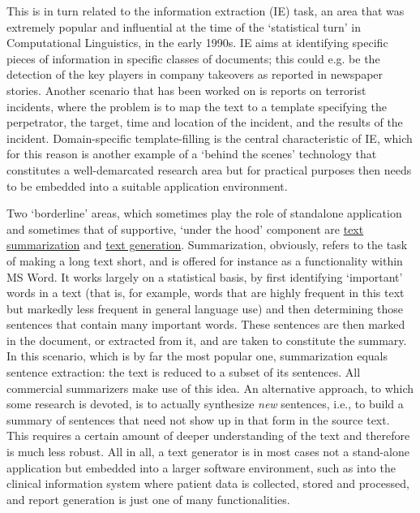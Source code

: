 \begin{multicols}{2}
\begin{itemize}
\begin{multicols}{2}

This is in turn related to the information extraction (IE) task, an area that was extremely popular and influential at the time of the ‘statistical turn’ in Computational Linguistics, in the early 1990s. IE aims at identifying specific pieces of information in specific classes of documents; this could e.g. be the detection of the key players in company takeovers as reported in newspaper stories. Another scenario that has been worked on is reports on terrorist incidents, where the problem is to map the text to a template specifying the perpetrator, the target, time and location of the incident, and the results of the incident. Domain-specific template-filling is the central characteristic of IE, which for this reason is another example of a ‘behind the scenes’ technology that constitutes a well-demarcated research area but for practical purposes then needs to be embedded into a suitable application environment. 

Two ‘borderline’ areas, which sometimes play the role of standalone application and sometimes that of supportive, ‘under the hood’ component are \uline{text summarization} and \uline{text generation}. Summarization, obviously, refers to the task of making a long text short, and is offered for instance as a functionality within MS Word. It works largely on a statistical basis, by first identifying ‘important’ words in a text (that is, for example, words that are highly frequent in this text but markedly less frequent in general language use) and then determining those sentences that contain many important words. These sentences are then marked in the document, or extracted from it, and are taken to constitute the summary. In this scenario, which is by far the most popular one, summarization equals sentence extraction: the text is reduced to a subset of its sentences. All commercial summarizers make use of this idea. An alternative approach, to which some research is devoted, is to actually synthesize \textit{new} sentences, i.e., to build a summary of sentences that need not show up in that form in the source text. This requires a certain amount of deeper understanding of the text and therefore is much less robust. All in all, a text generator is in most cases not a stand-alone application but embedded into a larger software environment, such as into the clinical information system where patient data is collected, stored and processed, and report generation is just one of many functionalities.


\end{multicols}
\end{itemize}
\end{multicols}
